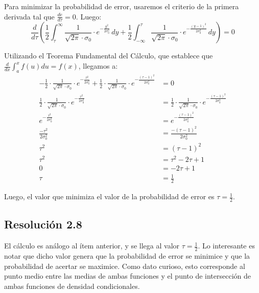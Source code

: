 \documentclass[
  11pt,
  letterpaper,
   addpoints,
  answers
  ]{exam}
\begin{document}
\begin{questions}
\begin{solution}
  Para minimizar la probabilidad de error, usaremos el criterio de la primera derivada tal que $\frac{de}{d\tau} = 0$. Luego:
  \begin{equation}
  \frac{d}{d\tau} \left( \frac{1}{2} \int_{\tau}^{\infty} \frac{1}{\sqrt{2\pi} \cdot \sigma_0} \cdot e^{-\frac{y^2}{2\sigma_0^2}} \, dy + \frac{1}{2} \int_{-\infty}^{\tau} \frac{1}{\sqrt{2\pi} \cdot \sigma_0} \cdot e^{-\frac{(y-1)^2}{2\sigma_0^2}} \, dy \right) = 0
  \end{equation}
  
  Utilizando el Teorema Fundamental del Cálculo, que establece que $\frac{d}{dx} \int_{a}^{x} f(u)du = f(x)$, llegamos a:
  \begin{align}
  -\frac{1}{2} \cdot \frac{1}{\sqrt{2\pi} \cdot \sigma_0} \cdot e^{-\frac{\tau^2}{2\sigma_0^2}} + \frac{1}{2} \cdot \frac{1}{\sqrt{2\pi} \cdot \sigma_0} \cdot e^{-\frac{(\tau-1)^2}{2\sigma_0^2}} &= 0\\
  \frac{1}{2} \cdot \frac{1}{\sqrt{2\pi} \cdot \sigma_0} \cdot e^{-\frac{\tau^2}{2\sigma_0^2}} &= \frac{1}{2} \cdot \frac{1}{\sqrt{2\pi} \cdot \sigma_0} \cdot e^{-\frac{(\tau-1)^2}{2\sigma_0^2}}\\
  e^{-\frac{\tau^2}{2\sigma_0^2}} &= e^{-\frac{(\tau-1)^2}{2\sigma_0^2}}\\
  \frac{-\tau^2}{2\sigma_0^2} &= \frac{-(\tau-1)^2}{2\sigma_0^2}\\
  \tau^2 &= (\tau-1)^2\\
  \tau^2 &= \tau^2 - 2\tau + 1\\
  0 &= -2\tau + 1\\
  \tau &= \frac{1}{2}
  \end{align}
  
  Luego, el valor que minimiza el valor de la probabilidad de error es $\tau = \frac{1}{2}$.

  \subsection*{Resolución 2.8}
  
  El cálculo es análogo al ítem anterior, y se llega al valor $\tau = \frac{1}{2}$. Lo interesante es notar que dicho valor genera que la probabilidad de error se minimice y que la probabilidad de acertar se maximice. Como dato curioso, esto corresponde al punto medio entre las medias de ambas funciones y el punto de intersección de ambas funciones de densidad condicionales.
  

\end{solution}
\end{questions}
\end{document}

